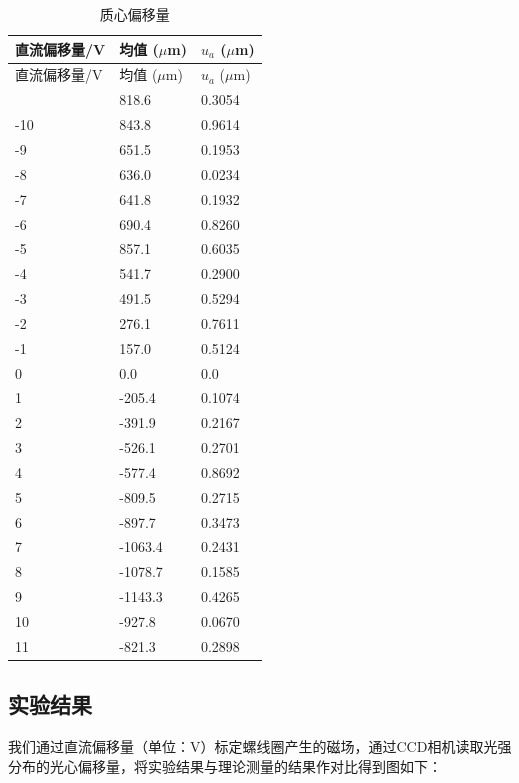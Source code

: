 \documentclass[12pt]{ctexart}
\numberwithin{equation}{section} %
\begin{document}
\begin{longtable}{p{2cm} p{4cm} p{3cm}} %
    \caption{质心偏移量} \label{tab:offset_uncertainty} \\ 
    \toprule
    直流偏移量/V & 均值 ($\mu$m) & $u_a$ ($\mu$m) \\
    \midrule
    \endfirsthead %
    
    \toprule
    直流偏移量/V & 均值 ($\mu$m) & $u_a$ ($\mu$m) \\
    \midrule
    \endhead %
    
    \bottomrule
    \endfoot %
    
    \endlastfoot %
    -11 & 818.6 & 0.3054 \\
    -10 & 843.8 & 0.9614 \\
    -9  & 651.5 & 0.1953 \\
    -8  & 636.0 & 0.0234 \\
    -7  & 641.8 & 0.1932 \\
    -6  & 690.4 & 0.8260 \\
    -5  & 857.1 & 0.6035 \\
    -4  & 541.7 & 0.2900 \\
    -3  & 491.5 & 0.5294 \\
    -2  & 276.1 & 0.7611 \\
    -1  & 157.0 & 0.5124 \\
    0   & 0.0   & 0.0 \\
    1   & -205.4 & 0.1074 \\
    2   & -391.9 & 0.2167 \\
    3   & -526.1 & 0.2701 \\
    4   & -577.4 & 0.8692 \\
    5   & -809.5 & 0.2715 \\
    6   & -897.7 & 0.3473 \\
    7   & -1063.4 & 0.2431 \\
    8   & -1078.7 & 0.1585 \\
    9   & -1143.3 & 0.4265 \\
    10  & -927.8 & 0.0670 \\
    11  & -821.3 & 0.2898 \\
    \bottomrule
\end{longtable}
\subsection{实验结果}
我们通过直流偏移量（单位：V）标定螺线圈产生的磁场，通过CCD相机读取光强分布的光心偏移量，将实验结果与理论测量的结果作对比得到图如下：
\end{document}
